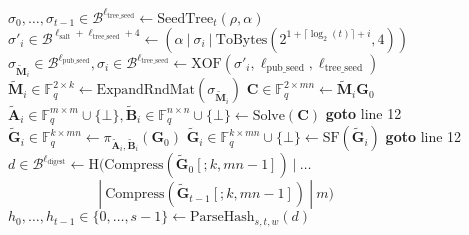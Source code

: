 \begin{algorithm}[H]
\begin{algorithmic}[1]
\State $\sigma_0, \ldots, \sigma_{t-1} \in \mathcal{B}^{\ell_\text{tree\_seed}} \gets \text{SeedTree}_t(\rho, \alpha)$
    \State $\sigma'_i \in \mathcal{B}^{\ell_\text{salt} + \ell_\text{tree\_seed} + 4} \gets (\alpha~|~\sigma_i~|~\text{ToBytes}(2^{1 + \lceil \log_2(t) \rceil + i}, 4))$
    \State $\sigma_{\tilde{\textbf{M}}_i} \in \mathcal{B}^{\ell_\text{pub\_seed}}, \sigma_i \in \mathcal{B}^{\ell_\text{tree\_seed}} \gets \text{XOF}(\sigma'_i, \ell_\text{pub\_seed}, \ell_\text{tree\_seed})$
    \State $\tilde{\textbf{M}}_i \in \mathds{F}_q^{2 \times k} \gets \text{ExpandRndMat}(\sigma_{\tilde{\textbf{M}}_i})$
    \State $\textbf{C} \in \mathds{F}_q^{2 \times mn} \gets \tilde{\textbf{M}}_i \textbf{G}_0$
    \State $\widetilde{\textbf{A}}_i \in \mathds{F}_q^{m \times m} \cup \{\bot\}, \widetilde{\textbf{B}}_i \in \mathds{F}_q^{n \times n} \cup \{\bot\} \gets \text{Solve}(\textbf{C})$
        \State \textbf{goto} line 12 %
    \EndIf
    \State $\tilde{\textbf{G}}_i \in \mathds{F}_q^{k \times mn} \gets \pi_{\widetilde{\textbf{A}}_i, \widetilde{\textbf{B}}_i}(\textbf{G}_0)$
    \State $\tilde{\textbf{G}}_i \in \mathds{F}_q^{k \times mn} \cup \{\bot\} \gets \text{SF}(\tilde{\textbf{G}}_i)$
        \State \textbf{goto} line 12 %
    \EndIf
\EndFor
\State $d \in \mathcal{B}^{\ell_\text{digest}} \gets \text{H}(\text{Compress}(\tilde{\textbf{G}}_0[;k,mn-1])~|~\ldots$\\
$\quad\quad\quad\quad\quad\quad~~|~\text{Compress}(\tilde{\textbf{G}}_{t-1}[;k,mn-1])~|~m)$
\State $h_0, \ldots, h_{t-1} \in \{0, \ldots, s-1\} \gets \text{ParseHash}_{s,t,w}(d)$

\end{algorithmic}
\end{algorithm}
